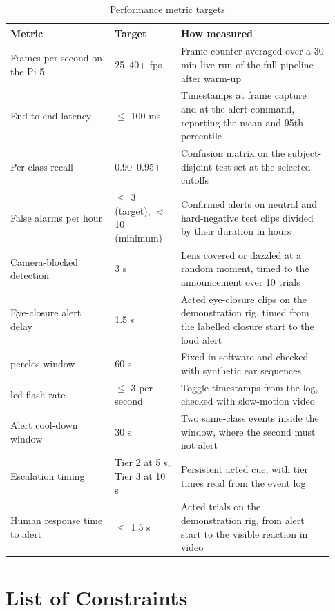 \begin{table}[htbp]
\centering
\caption{Performance metric targets}
\label{tab:ch4-02}
\footnotesize
\setlength{\tabcolsep}{3pt}
\renewcommand{\arraystretch}{1.15}
\begin{tabular}{|p{0.300\linewidth}|p{0.190\linewidth}|p{0.440\linewidth}|}
\hline
\textbf{Metric} & \textbf{Target} & \textbf{How measured} \\
\hline
Frames per second on the Pi 5 & 25--40+ \gls{fps} & Frame counter averaged over a 30 min live run of the full pipeline after warm-up \\
\hline
End-to-end latency & $\le$ 100 ms & Timestamps at frame capture and at the alert command, reporting the mean and 95th percentile \\
\hline
Per-class recall & 0.90--0.95+ & Confusion matrix on the subject-disjoint test set at the selected cutoffs \\
\hline
False alarms per hour & $\le$ 3 (target), $<$ 10 (minimum) & Confirmed alerts on neutral and hard-negative test clips divided by their duration in hours \\
\hline
Camera-blocked detection & 3 s & Lens covered or dazzled at a random moment, timed to the announcement over 10 trials \\
\hline
Eye-closure alert delay & 1.5 s & Acted eye-closure clips on the demonstration rig, timed from the labelled closure start to the loud alert \\
\hline
\gls{perclos} window & 60 s & Fixed in software and checked with synthetic \gls{ear} sequences \\
\hline
\gls{led} flash rate & $\le$ 3 per second & Toggle timestamps from the log, checked with slow-motion video \\
\hline
Alert cool-down window & 30 s & Two same-class events inside the window, where the second must not alert \\
\hline
Escalation timing & Tier 2 at 5 s, Tier 3 at 10 s & Persistent acted cue, with tier times read from the event log \\
\hline
Human response time to alert & $\le$ 1.5 s & Acted trials on the demonstration rig, from alert start to the visible reaction in video \\
\hline
\end{tabular}
\end{table}

\section{List of Constraints}

